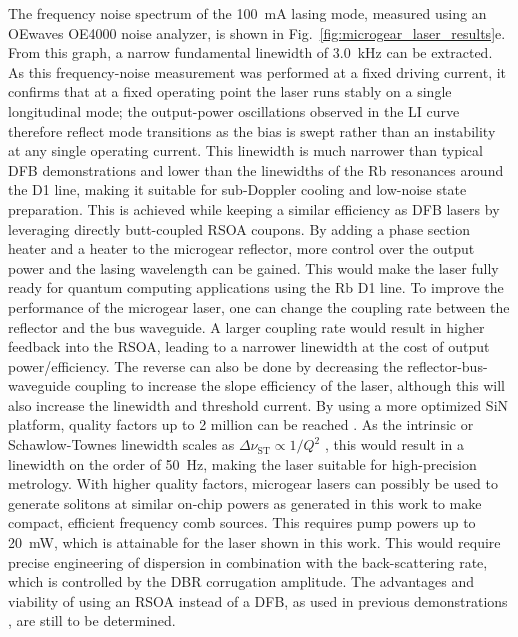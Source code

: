 \documentclass[%
 reprint,
 amsmath,amssymb,
 aps,
]{revtex4-2}
\begin{document}
The frequency noise spectrum of the 100~mA lasing mode, measured using an OEwaves OE4000 noise analyzer, is shown in Fig.~\ref{fig:microgear_laser_results}e. From this graph, a narrow fundamental linewidth of 3.0~kHz can be extracted. As this frequency-noise measurement was performed at a fixed driving current, it confirms that at a fixed operating point the laser runs stably on a single longitudinal mode; the output-power oscillations observed in the LI curve therefore reflect mode transitions as the bias is swept rather than an instability at any single operating current. This linewidth is much narrower than typical DFB demonstrations and lower than the linewidths of the Rb resonances around the D1 line, making it suitable for sub-Doppler cooling and low-noise state preparation. This is achieved while keeping a similar efficiency as DFB lasers by leveraging directly butt-coupled RSOA coupons. By adding a phase section heater and a heater to the microgear reflector, more control over the output power and the lasing wavelength can be gained. This would make the laser fully ready for quantum computing applications using the Rb D1 line.
To improve the performance of the microgear laser, one can change the coupling rate between the reflector and the bus waveguide. A larger coupling rate would result in higher feedback into the RSOA, leading to a narrower linewidth at the cost of output power/efficiency. The reverse can also be done by decreasing the reflector-bus-waveguide coupling to increase the slope efficiency of the laser, although this will also increase the linewidth and threshold current. By using a more optimized SiN platform, quality factors up to 2 million can be reached \cite{ulanov2024synthetic}. As the intrinsic or Schawlow-Townes linewidth scales as $\Delta\nu_{\mathrm{ST}}\propto1/Q^2$ \cite{fan2020hybrid,coldren2012diode}, this would result in a linewidth on the order of 50~Hz, making the laser suitable for high-precision metrology.
With higher quality factors, microgear lasers can possibly be used to generate solitons at similar on-chip powers as generated in this work \cite{yu2021spontaneous} to make compact, efficient frequency comb sources. This requires pump powers up to 20~mW, which is attainable for the laser shown in this work. This would require precise engineering of dispersion in combination with the back-scattering rate, which is controlled by the DBR corrugation amplitude. The advantages and viability of using an RSOA instead of a DFB, as used in previous demonstrations \cite{ulanov2024synthetic}, are still to be determined.
\end{document}
